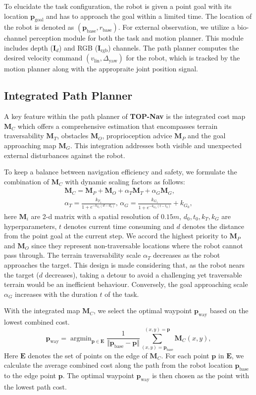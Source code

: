 \documentclass[conference]{IEEEtran}
\DeclareMathOperator*{\argmin}{argmin}
\begin{document}
To elucidate the task configuration, the robot is given a point goal with its location $\bm{p}_\textrm{goal}$ and has to approach the goal within a limited time. The location of the robot is denoted as $(\bm{p}_\textrm{base},r_\textrm{base})$. For external observation, we utilize a bio-channel perception module for both the task and motion planner. This module includes depth ($\bm{I}_d$) and RGB ($\bm{I}_\textrm{rgb}$) channels. The path planner computes the desired velocity command $(v_\textrm{lin},\Delta_\textrm{yaw})$ for the robot, which is tracked by the motion planner along with the appropraite joint position signal.

\subsection{Integrated Path Planner}
A key feature within the path planner of \textbf{TOP-Nav} is the integrated cost map $\bm{M}_C$ which offers a comprehensive estimation that encompasses terrain traversability $\bm{M}_T$, obstacles $\bm{M}_O$, proprioception advice $\bm{M}_P$ and the goal approaching map $\bm{M}_G$. This integration addresses both visible and unexpected external disturbances against the robot. 

To keep a balance between navigation efficiency and safety, we formulate the combination of $\bm{M}_C$ with dynamic scaling factors as follows:
\begin{gather}
    \bm{M}_C=\bm{M}_P+\bm{M}_O+{\alpha_T}\bm{M}_T+{\alpha_G}\bm{M}_G,\\
    \alpha_T=\frac{k_{T_1}}{1+e^{-k_{T_2}(d-d_0)}} \text{, }
    \alpha_G=\frac{k_{G_1}}{1+e^{-k_{G_2}(t-t_0)}}+k_{G_0},
\end{gather}
{here $\bm{M}_i$ are 2-d matrix with a spatial resolution of $0.15m$,} $d_0,t_0,k_T,k_G$ are hyperparameters, ${t}$ denotes current time consuming and ${d}$ denotes the distance from the point goal at the current step. We accord the highest priority to $\bm{M}_P$ and $\bm{M}_O$ since they represent non-traversable locations where the robot cannot pass through. The terrain traversability scale ${\alpha_T}$ decreases as the robot approaches the target. This design is made considering that, as the robot nears the target (${d}$ decreases), taking a detour to avoid a challenging yet traversable terrain would be an inefficient behaviour. Conversely, the goal approaching scale ${\alpha_G}$ increases with the duration ${t}$ of the task.

With the integrated map $\bm{M}_C$, we select the optimal waypoint $\bm{p}_\textrm{way}$ based on the lowest combined cost.
\begin{equation}
\bm{p}_\textrm{way}=\argmin_{\bm{p} \in \bm{E}}\frac{1}{\Vert \bm{p}_\textrm{base}-\bm{p} \Vert}\sum_{(x,y)=\bm{p}_\textrm{base}}^{{(x,y)=\bm{p}}}\bm{M}_C(x,y), 
\label{eq}\end{equation}
Here $\bm{E}$ denotes the set of points on the edge of $\bm{M}_C$. For each point $\bm{p}$ in $\bm{E}$, we calculate the average combined cost along the path from the robot location $\bm{p}_\textrm{base}$ to the edge point $\bm{p}$. The optimal waypoint $\bm{p}_\textrm{way}$ is then chosen as the point with the lowest path cost.
\end{document}
